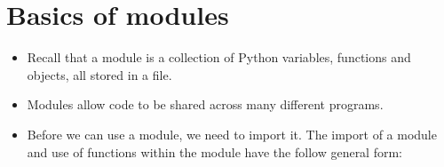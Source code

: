 \documentclass[letterpaper,10pt,english]{sphinxmanual}
\begin{document}
\section{Basics of modules}
\label{\detokenize{lecture_notes/lec07_modules_images:basics-of-modules}}\begin{itemize}
\item {} 
Recall that a module is a collection of Python variables, functions
and objects, all stored in a file.

\item {} 
Modules allow code to be shared across many different programs.

\item {} 
Before we can use a module, we need to import it.  The import of a
module and use of functions within the module have the follow
general form:

\begin{sphinxVerbatim}[commandchars=\\\{\}]
 
\end{sphinxVerbatim}

\end{itemize}
\end{document}
